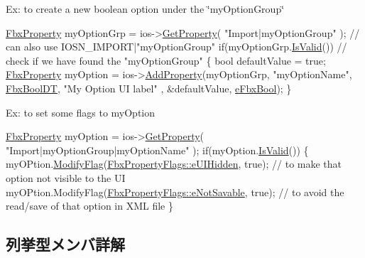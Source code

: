 Ex\+: to create a new boolean option under the \char`\"{}my\+Option\+Group\char`\"{} 
\begin{DoxyCode}
\hyperlink{class_fbx_property}{FbxProperty} myOptionGrp = ios->\hyperlink{class_fbx_i_o_settings_aa02805702152a4ef56d337c25b12d42b}{GetProperty}( \textcolor{stringliteral}{"Import|myOptionGroup"} ); \textcolor{comment}{// can also use
       IOSN\_IMPORT|"myOptionGroup"}
\textcolor{keywordflow}{if}(myOptionGrp.\hyperlink{class_fbx_property_a1c40042c55d1f4a1d4837f06fbc1d764}{IsValid}()) \textcolor{comment}{// check if we have found the "myOptionGroup"}
\{
    \textcolor{keywordtype}{bool} defaultValue = \textcolor{keyword}{true};
      \hyperlink{class_fbx_property}{FbxProperty} myOption = ios->\hyperlink{class_fbx_i_o_settings_adcfa47da119520473f466bfff28cdbe2}{AddProperty}(myOptionGrp, \textcolor{stringliteral}{"myOptionName"}, 
      \hyperlink{fbxdatatypes_8h_a7b9d9eb0294ea5d7afe3362f668f2c94}{FbxBoolDT}, \textcolor{stringliteral}{"My Option UI label"} , &defaultValue, \hyperlink{fbxpropertytypes_8h_a73913a5ddfb20e57c6f25e9e6784bd92a4d86dfd4dbf3125592aaff150ba4deb4}{eFbxBool});
\}
\end{DoxyCode}


Ex\+: to set some flags to my\+Option 
\begin{DoxyCode}
\hyperlink{class_fbx_property}{FbxProperty} myOption = ios->\hyperlink{class_fbx_i_o_settings_aa02805702152a4ef56d337c25b12d42b}{GetProperty}( \textcolor{stringliteral}{"Import|myOptionGroup|myOptionName"} );
\textcolor{keywordflow}{if}(myOption.\hyperlink{class_fbx_property_a1c40042c55d1f4a1d4837f06fbc1d764}{IsValid}())
\{
      myOPtion.\hyperlink{class_fbx_property_a16da0381546978afc477b033239f1fc9}{ModifyFlag}(\hyperlink{class_fbx_property_flags_afabfa7e0949aac8a7dcdf8a141867e99a4da19ebe24aecee0a09724a84142aaae}{FbxPropertyFlags::eUIHidden}, \textcolor{keyword}{true});   \textcolor{comment}{// to
       make that option not visible to the UI}
      myOPtion.ModifyFlag(\hyperlink{class_fbx_property_flags_afabfa7e0949aac8a7dcdf8a141867e99a11531771ac2c7b07d8b49641028f2b57}{FbxPropertyFlags::eNotSavable}, \textcolor{keyword}{true}); \textcolor{comment}{// to avoid
       the read/save of that option in XML file}
\}
\end{DoxyCode}
 

\subsection{列挙型メンバ詳解}
\mbox{\label{class_fbx_i_o_settings_a8a5d3220d6ca36856bb81bcb1f4c779b}} 
